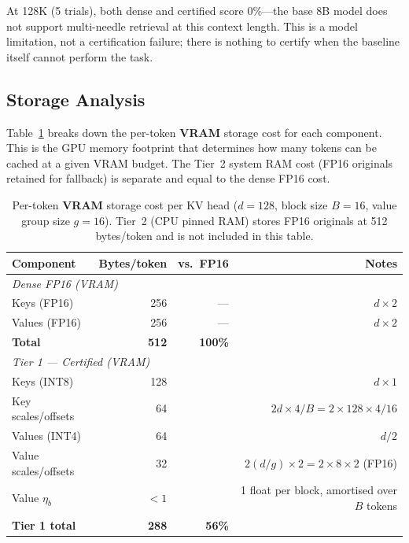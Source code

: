 \documentclass[11pt,a4paper]{article}
\theoremstyle{definition}
\theoremstyle{remark}
\begin{document}
At 128K (5 trials), both dense and certified score 0\%---the base 8B model does not support multi-needle retrieval at this context length.  This is a model limitation, not a certification failure; there is nothing to certify when the baseline itself cannot perform the task.

\subsection{Storage Analysis}
\label{sec:storage}

Table~\ref{tab:storage} breaks down the per-token \textbf{VRAM} storage cost for each component.  This is the GPU memory footprint that determines how many tokens can be cached at a given VRAM budget.  The Tier~2 system RAM cost (FP16 originals retained for fallback) is separate and equal to the dense FP16 cost.

\begin{table}[H]
\centering
\caption{Per-token \textbf{VRAM} storage cost per KV head ($d{=}128$, block size $B{=}16$, value group size $g{=}16$).  Tier~2 (CPU pinned RAM) stores FP16 originals at 512 bytes/token and is not included in this table.}
\label{tab:storage}
\small
\begin{tabular}{lrrr}
\toprule
\textbf{Component} & \textbf{Bytes/token} & \textbf{vs.\ FP16} & \textbf{Notes} \\
\midrule
\multicolumn{4}{l}{\emph{Dense FP16 (VRAM)}} \\
Keys (FP16)   & 256 & --- & $d \times 2$ \\
Values (FP16) & 256 & --- & $d \times 2$ \\
\textbf{Total} & \textbf{512} & \textbf{100\%} & \\
\midrule
\multicolumn{4}{l}{\emph{Tier 1 --- Certified (VRAM)}} \\
Keys (INT8)        & 128 & & $d \times 1$ \\
Key scales/offsets & 64  & & $2d \times 4 / B = 2 \times 128 \times 4 / 16$ \\
Values (INT4)      & 64  & & $d / 2$ \\
Value scales/offsets & 32  & & $2(d/g) \times 2 = 2 \times 8 \times 2$ (FP16) \\
Value $\eta_b$     & $<1$ & & 1 float per block, amortised over $B$ tokens \\
\textbf{Tier 1 total} & \textbf{288} & \textbf{56\%} & \\
\bottomrule
\end{tabular}
\end{table}
\end{document}
